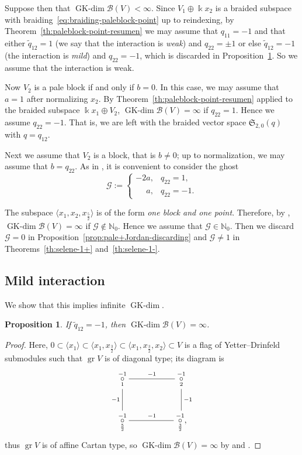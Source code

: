 \documentclass[10pt,a4paper]{amsart}
\numberwithin{equation}{section}
\newtheorem{Proposition}[Theorem]{Proposition}
 { \theoremstyle{definition}
\newtheorem{Definition}[Theorem]{Definition}
\newtheorem{Note}[Theorem]{Note}
\newtheorem{Example}[Theorem]{Example}
\newtheorem{Remark}[Theorem]{Remark} }
\newcommand{\GK}{\operatorname{GK-dim}}
\newcommand{\gr}{\operatorname{gr}}
\newcommand{\toba}{\mathscr B}
\newcommand{\ghost}{\mathscr{G}}
\newcommand{\sele}{\mathfrak{S}}
\newcommand{\N}{{\mathbb N}}
\newcommand{\tresdos}{\frac{3}{2}}
\newcommand{\cincodos}{\frac{5}{2}}
\begin{document}
Suppose then that $\GK \toba(V) < \infty$.
Since $V_1 \oplus \Bbbk x_2$ is a braided subspace with braiding~\eqref{eq:braiding-paleblock-point} up to reindexing,
by Theorem~\ref{th:paleblock-point-resumen}
we may assume that $q_{11} = -1$ and
that either $\widetilde{q}_{12}=1$ (we say that the interaction is \emph{weak}) and $q_{22}=\pm 1$
or else $\widetilde{q}_{12}=-1$ (the interaction is \emph{mild}) and $q_{22}=-1$,
which is discarded in Proposition~\ref{prop:mild-2blocks}.
So we assume that the interaction is weak.

Now $V_2$ is a pale block if and only if $b=0$. In this case, we may assume that $a =1$ after normalizing $x_2$.
By Theorem~\ref{th:paleblock-point-resumen} applied to the braided subspace $\Bbbk x_1\oplus V_2$, $\GK \toba(V) =\infty$ if $q_{22}=1$.
Hence we assume $q_{22}=-1$. That is, we are left with the braided vector space $\sele_{2,0}(q)$ with $q= q_{12}$.

Next we assume that $V_2$ is a block, that is $b\neq 0$; up to normalization, we may assume that $b= q_{22}$.
As in \cite{AAH-triang}, it is convenient to consider the ghost
\begin{equation}\label{eq:discrete-ghost}
\ghost := \begin{cases} -2a, & q_{22} = 1,
\\
\phantom{-2}a, & q_{22} = -1.
\end{cases}
\end{equation}

The subspace $\big\langle x_1, x_2, x_\cincodos \big\rangle$ is of the form
\emph{one block and one point}. Therefore,
by \cite[Lem\-ma~4.2.3]{AAH-triang},
$\GK \toba(V) =\infty$ if $\ghost \notin \N_0$.
Hence we assume that $\ghost\in \N_0$. Then we discard $\ghost = 0$ in
Proposition~\ref{prop:pale+Jordan-discarding} and $\ghost \neq 1$ in Theorems~\ref{th:selene-1+} and~\ref{th:selene-1-}.

\subsection{Mild interaction} 

We show that this implies infinite $\GK$.

\begin{Proposition}\label{prop:mild-2blocks}
If $\widetilde{q}_{12} = -1$, then $\GK \toba(V)=\infty$.
\end{Proposition}
\begin{proof}
Here, $0 \subset \langle x_1\rangle \subset \big\langle x_1, x_{\tresdos} \big\rangle \subset \big\langle x_1, x_{\tresdos}, x_2 \big\rangle \subset V$ is a flag of Yetter--Drinfeld submodules such that $\gr V$ is of diagonal type; its diagram is
$$
\xymatrix{
\overset{-1}{\underset{1} {\circ}}\ar @{-}[d]_{-1} \ar @{-}[rr]^{-1} & & \overset{-1} {\underset{2} {\circ}}\ar @{-}[d]^{-1} \\
\overset{-1}{\underset{\cincodos} {\circ}} \ar @{-}[rr]^{-1} && \overset{-1}{\underset{\tresdos} {\circ}},}
$$
thus $\gr V$ is of affine Cartan type, so $\GK \toba(V) = \infty$ by \cite{AAH-diag} and
\cite[Lemma~3.4.2\,(c)]{AAH-triang}.
\end{proof}
\end{document}
